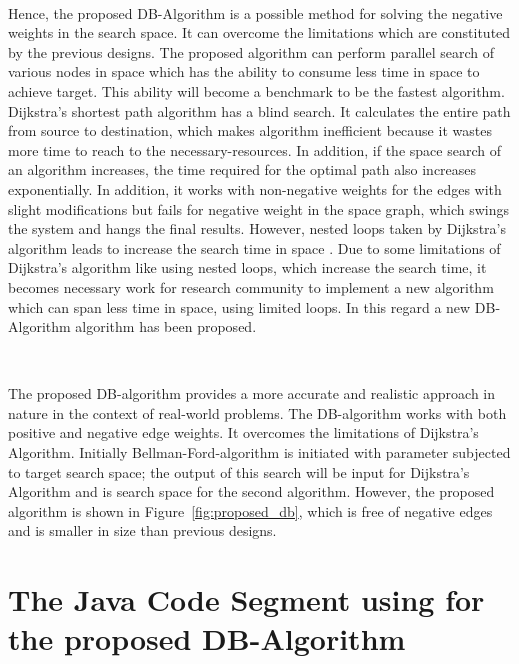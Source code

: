 \documentclass[10pt]{NSP1}
\begin{document}
~

	Hence, the proposed DB-Algorithm is a possible method for solving the negative weights in the search space. It can overcome the limitations which are constituted by the previous designs. The proposed algorithm can perform parallel search of various nodes in space which has the ability to consume less time in space to achieve target. This ability will become a benchmark to be the fastest algorithm. Dijkstra's shortest path algorithm has a blind search. It calculates the entire path from source to destination, which makes algorithm inefficient because it wastes more time to reach to the necessary-resources. In addition, if the space search of an algorithm increases, the time required for the optimal path also increases exponentially. In addition, it works with non-negative weights for the edges with slight modifications but fails for negative weight in the space graph, which swings the system and hangs the final results. However, nested loops taken by Dijkstra's algorithm leads to increase the search time in space \cite{Hlupic2025,Dory2025}. Due to some limitations of Dijkstra's algorithm like using nested loops, which increase the search time, it becomes necessary work for research community to implement a new algorithm which can span less time in space, using limited loops. In this regard a new DB-Algorithm algorithm has been proposed.

~

	The proposed DB-algorithm provides a more accurate and realistic approach in nature in the context of real-world problems. The DB-algorithm works with both positive and negative edge weights. It overcomes the limitations of Dijkstra's Algorithm. Initially Bellman-Ford-algorithm is initiated with parameter subjected to target search space; the output of this search will be input for Dijkstra's Algorithm and is search space for the second algorithm. However, the proposed algorithm is shown in Figure~\ref{fig:proposed_db}, which is free of negative edges and is smaller in size than previous designs.

	
	
\section{The Java Code Segment using for the proposed DB-Algorithm}
	
\end{document}
